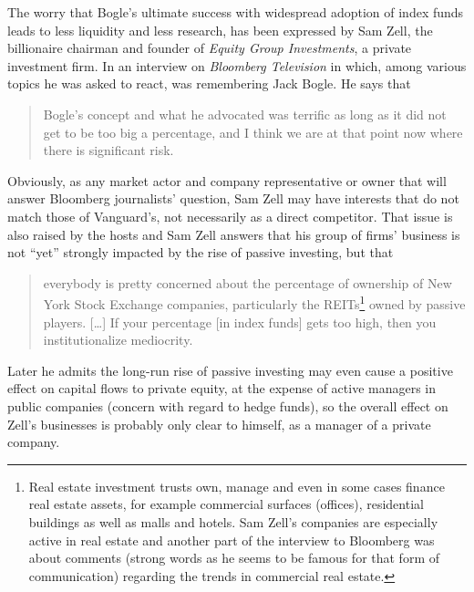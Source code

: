 The worry that Bogle's ultimate success with widespread adoption of index funds leads to less liquidity and less research, has been expressed by Sam Zell, the billionaire chairman and founder of \textit{Equity Group Investments}, a private investment firm. In an interview on \textit{Bloomberg Television} in which, among various topics he was asked to react, was remembering Jack Bogle. He says that
\begin{quotation}
Bogle's concept and what he advocated was terrific as long as it did not get to be too big a percentage, and I think we are at that point now where there is significant risk.
\end{quotation}
Obviously, as any market actor and company representative or owner that will answer Bloomberg journalists' question, Sam Zell may have interests that do not match those of Vanguard's, not necessarily as a direct competitor. That issue is also raised by the hosts and Sam Zell answers that his group of firms' business is not ``yet'' strongly impacted by the rise of passive investing, but that
\begin{quotation}
everybody is pretty concerned about the percentage of ownership of New York Stock Exchange companies, particularly the REITs\footnote{Real estate investment trusts own, manage and even in some cases finance real estate assets, for example commercial surfaces (offices), residential buildings as well as malls and hotels. Sam Zell's companies are especially active in real estate and another part of the interview to Bloomberg was about comments (strong words as he seems to be famous for that form of communication) regarding the trends in commercial real estate.} owned by passive players. [\ldots] If your percentage [in index funds] gets too high, then you institutionalize mediocrity.
\end{quotation}
Later he admits the long-run rise of passive investing may even cause a positive effect on capital flows to private equity, at the expense of active managers in public companies (concern with regard to hedge funds), so the overall effect on Zell's businesses is probably only clear to himself, as a manager of a private company.

